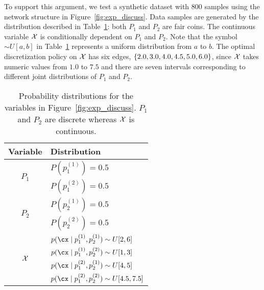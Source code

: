 To support this argument, we test a synthetic dataset with $800$ samples using the network structure in Figure~\ref{fig:exp_discuss}.
Data samples are generated by the distribution described in Table~\ref{table:distri_exp}: both $P_1$ and $P_2$ are fair coins.
The continuous variable $\mathcal{X}$ is conditionally dependent on $P_1$ and $P_2$.
Note that the symbol $\sim U[a,b]$ in Table~\ref{table:distri_exp} represents a uniform distribution from $a$ to $b$.
The optimal discretization policy on $\mathcal{X}$ has six edges, $\curly{2.0,3.0,4.0,4.5,5.0,6.0}$, since $\mathcal{X}$ takes numeric values from $1.0$ to $7.5$ and there are seven intervals corresponding to different joint distributions of $P_1$ and $P_2$.

\begin{table}[ht]
	\centering
	\caption{Probability distributions for the variables in Figure~\ref{fig:exp_discuss}.
           $P_1$ and $P_2$ are discrete whereas $\mathcal{X}$ is continuous.}
	\label{table:distri_exp}
	\begin{tabular}{cl}
		\toprule
		Variable               & Distribution                                   \\ \midrule
		\multirow{2}{*}{$P_1$}&$P(p^{(1)}_1) = 0.5$     \\
		                                       & $P(p^{(2)}_1) = 0.5$     \\ \midrule
		\multirow{2}{*}{$P_2$}&$P(p^{(1)}_2) = 0.5$     \\
		                                       &$P(p^{(2)}_2) = 0.5$     \\ \midrule
		\multirow{4}{*}{$\mathcal{X}$} & $p(\cx \mid p^{(1)}_1,p^{(1)}_2) \sim U[2,6]$\\
		                                     & $p(\cx \mid p^{(1)}_1,p^{(2)}_2) \sim U[1,3]$ \\
		                                     & $p(\cx \mid p^{(2)}_1,p^{(1)}_2) \sim U[4,5]$ \\
		                                     & $p(\cx \mid p^{(2)}_1,p^{(2)}_2) \sim U[4.5,7.5]$\\
		\bottomrule
	\end{tabular}
\end{table}


